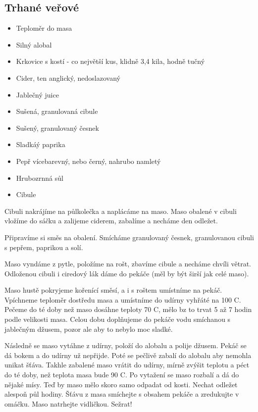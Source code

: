 \documentclass[10pt,a4paper]{article}
\newenvironment{myitemize}
{ \begin{itemize}
    \setlength{\itemsep}{0pt}
    \setlength{\parskip}{0pt}
    \setlength{\parsep}{0pt}     }
{ \end{itemize}                  }
\begin{document}
\subsection{Trhané veřové}
\begin{minipage}[t]{0,5\textwidth}
\begin{myitemize} 
\item Teploměr do masa
\item Silný alobal
\item Krkovice s kostí - co největší kus, klidně 3,4 kila, hodně tučný
\item Cider, ten anglický, nedoslazovaný
\item Jablečný juice
\item Sušená, granulovaná cibule
\item Sušený, granulovaný česnek
\item Sladkáý paprika
\item Pepř vícebarevný, nebo černý, nahrubo namletý
\item Hrubozrnná sůl
\item Cibule
\end{myitemize}
\end{minipage}
\begin{minipage}[t]{0,5\textwidth}
Cibuli nakrájíme na půlkolečka a naplácáme na maso. Maso obalené v cibuli vložíme do sáčku a zalijeme ciderem, zabalíme a necháme den odležet. 

Připravíme si směs na obalení. Smícháme granulovaný česnek, granulovanou cibuli s pepřem, paprikou a solí. 

Maso vyndáme z pytle, položíme na rošt, zbavíme cibule a necháme chvíli větrat. Odloženou cibuli i ciredový lák dáme do pekáče (měl by být širší jak celé maso). 

Maso hustě pokryjeme kořenící směsí, a i s roštem umístníme na pekáč. Vpíchneme teploměr dostředu masa a umístníme do udírny vyhřáté na 100 \degree C. Pečeme do té doby než maso dosáhne teploty 70 \degree C, mělo bz to trvat 5 až 7 hodin podle velikosti masa. Celou dobu doplňujeme do pekáče vodu smíchanou s jablečným džusem, pozor ale aby to nebylo moc sladké.

Následně se maso vytáhne z udírny, položí do alobalu a polije džusem. Pekáč se dá bokem a do udírny už nepřijde. Poté se pečlivě zabalí do alobalu aby nemohla unikat šťáva. Takhle zabalené maso vrátit do udírny, mírně zvýšit teplotu a péct do té doby, než teplota masa bude 90 \degree C. 
Po vytažení se maso rozbalí a dá do nějaké mísy. Teď by maso mělo skoro samo odpadat od kosti. Nechat odležet alespoň půl hodiny. Šťávu z masa smíchejte s obsahem pekáče a zredukujte v omáčku. Maso natrhejte vidličkou. Sežrat!
\end{minipage}
\pagebreak
\end{document}

